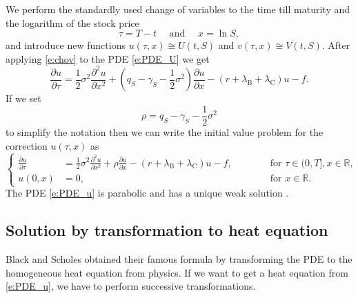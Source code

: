\documentclass[a4paper,10pt]{article}
\newcommand{\R}{\mathbb{R}}
\newcommand{\1}{\mathbf{1}}
\begin{document}
We perform the standardly used change of variables to the time till maturity and the logarithm of the stock price
\begin{equation}\label{e:chov}
\tau=T-t\quad\text{ and }\quad x=\ln S,
\end{equation}
and introduce new functions $u(\tau,x)\cong U(t,S)$ and $v(\tau,x)\cong V(t,S)$. After applying \eqref{e:chov} to the PDE \eqref{e:PDE_U} we get
\begin{equation}
\frac{\partial u}{\partial \tau}=\frac{1}{2}\sigma^2 \frac{\partial^2 u}{\partial x^2}+\left(q_S-\gamma_S-\frac{1}{2}\sigma^2\right) \frac{\partial u}{\partial x}-(r+\lambda_\text{B}+\lambda_\text{C})u-f.
\end{equation}
If we set
\begin{equation}\label{e:rho}
\rho=q_S-\gamma_S-\frac{1}{2} \sigma^2
\end{equation}
to simplify the notation then we can write the initial value problem for the correction $u(\tau,x)$ as
\begin{equation}\label{e:PDE_u}
\left\{
\begin{aligned}
\frac{\partial u}{\partial \tau} &= \frac{1}{2}\sigma^2 \frac{\partial^2 u}{\partial x^2}+\rho\frac{\partial u}{\partial x}-(r+\lambda_\text{B}+\lambda_\text{C})u-f, &&\qquad\text{ for } \tau\in(0,T], x\in\R, \\
u(0,x) &= 0, &&\qquad\text{ for } x\in\R. 
\end{aligned}
\right.
\end{equation}
The PDE \eqref{e:PDE_u} is parabolic and has a unique weak solution \citep{Evans10}.

\subsection{Solution by transformation to heat equation}

Black and Scholes obtained their famous formula by transforming the PDE to the homogeneous heat equation from physics. If we want to get a heat equation from \eqref{e:PDE_u}, we have to perform successive transformations.
\end{document}
